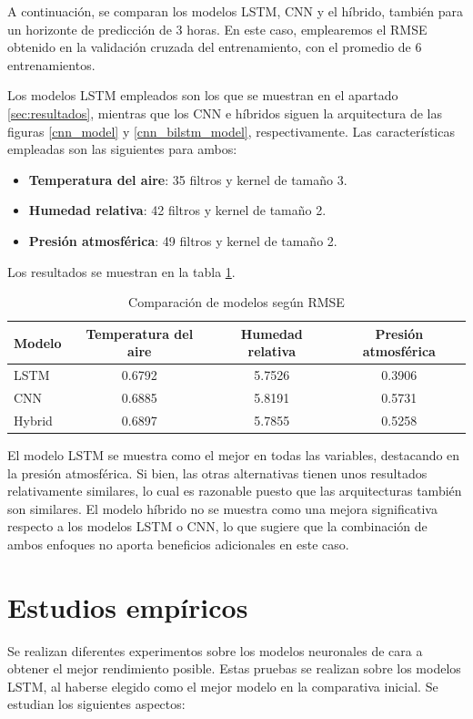 A continuación, se comparan los modelos LSTM, CNN y el híbrido, también para un horizonte de predicción de 3 horas. En este caso,
emplearemos el RMSE obtenido en la validación cruzada del entrenamiento, con el promedio de 6 entrenamientos.

Los modelos LSTM empleados son los que se muestran en el apartado \ref{sec:resultados}, mientras que los CNN e híbridos siguen la arquitectura de las figuras
\ref{cnn_model} y \ref{cnn_bilstm_model}, respectivamente. Las características empleadas son las siguientes para ambos:
\begin{itemize}
    \item \textbf{Temperatura del aire}: 35 filtros y kernel de tamaño 3.
    \item \textbf{Humedad relativa}: 42 filtros y kernel de tamaño 2.
    \item \textbf{Presión atmosférica}: 49 filtros y kernel de tamaño 2.
\end{itemize}


Los resultados se muestran en la tabla \ref{comparativa_inicial_neuronal}.
\begin{table}[h!]
\centering
\begin{tabular}{|l|c|c|c|}
\hline
\textbf{Modelo} & \textbf{Temperatura del aire} & \textbf{Humedad relativa} & \textbf{Presión atmosférica} \\
\hline
LSTM   &     0.6792          &      5.7526          &       0.3906            \\
\hline
CNN    &      0.6885         &     5.8191         &       0.5731         \\
\hline
Hybrid &       0.6897        &      5.7855           &   0.5258                  \\
\hline
\end{tabular}
\caption{Comparación de modelos según RMSE}
\label{comparativa_inicial_neuronal}
\end{table}  

El modelo LSTM se muestra como el mejor en todas las variables, destacando en la presión atmosférica. Si bien, las otras alternativas tienen unos resultados relativamente similares,
lo cual es razonable puesto que las arquitecturas también son similares.
El modelo híbrido no se muestra como una mejora significativa respecto a los modelos LSTM o CNN, lo que sugiere que la combinación de ambos enfoques no aporta beneficios adicionales en este caso.

\section{Estudios empíricos}
Se realizan diferentes experimentos sobre los modelos neuronales de cara a obtener el mejor rendimiento posible. Estas pruebas se realizan sobre los modelos LSTM, al haberse
elegido como el mejor modelo en la comparativa inicial. Se estudian los siguientes aspectos:

